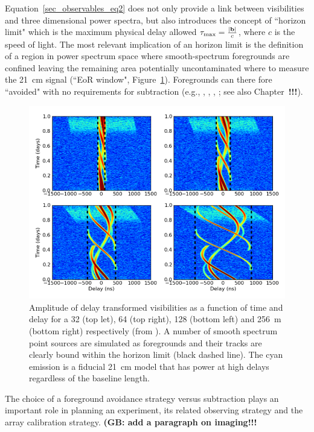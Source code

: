 Equation~\ref{sec_observables_eq2} does not only provide a link between visibilities and three dimensional power spectra, but also introduces the concept of ``horizon limit" which is the maximum physical delay allowed $\tau_{\rm max} = \frac{|{\bf b}|}{c}$, where $c$ is the speed of light. The most relevant implication of an horizon limit is the definition of a region in power spectrum space where smooth-spectrum foregrounds are confined leaving the remaining area potentially uncontaminated where to measure the 21~cm signal (``EoR window", Figure~\ref{fig:fig2}). Foregrounds can there fore ``avoided" with no requirements for subtraction (e.g., \cite{morales12}, \cite{vedantham12}, \cite{pober13}, \cite{thyagarajan13}; see also Chapter~{\bf !!!}).
\begin{figure}[]
\begin{center}
\includegraphics[width=1.\textwidth]{Bernardi/delay_transform}
\end{center}
\caption{Amplitude of delay transformed visibilities as a function of time and delay for a 32 (top let), 64 (top right), 128 (bottom left) and 256~m (bottom right) respectively (from \cite{parsons12a}). A number of smooth spectrum point sources are simulated as foregrounds and their tracks are clearly bound within the horizon limit (black dashed line). The cyan emission is a fiducial 21~cm model that has power at high delays regardless of the baseline length.}
\label{fig:fig2}
\end{figure}
The choice of a foreground avoidance strategy versus subtraction plays an important role in planning an experiment, its related observing strategy and the array calibration strategy.
{\bf (GB: add a paragraph on imaging!!!}


